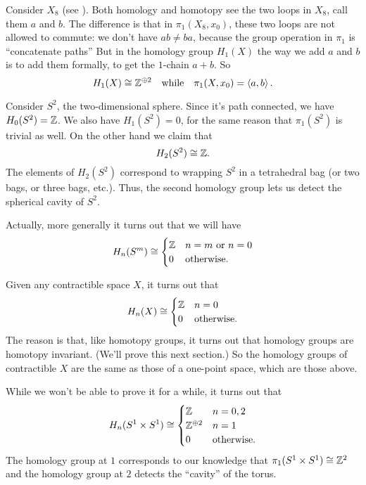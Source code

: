\begin{example}
	Consider $X_8$ (see ).
	Both homology and homotopy see the two loops in $X_8$, call them $a$ and $b$.
	The difference is that in $\pi_1(X_8, x_0)$,
	these two loops are not allowed to commute: we don't have $ab \neq ba$,
	because the group operation in $\pi_1$ is ``concatenate paths''
	But in the homology group $H_1(X)$ the way we add $a$ and $b$
	is to add them formally, to get the $1$-chain $a+b$.
	So \[ H_1(X) \cong \mathbb Z^{\oplus 2} \quad\text{while}\quad \pi_1(X, x_0) = \left< a,b\right>. \]
\end{example}

\begin{example}
	Consider $S^2$, the two-dimensional sphere.
	Since it's path connected, we have $H_0(S^2) = \mathbb Z$.
	We also have $H_1(S^2) = 0$, for the same reason that $\pi_1(S^2)$ is trivial as well.
	On the other hand we claim that \[ H_2(S^2) \cong \mathbb Z. \]
	The elements of $H_2(S^2)$ correspond to wrapping $S^2$ in a tetrahedral bag
	(or two bags, or three bags, etc.).
	Thus, the second homology group lets us detect the spherical cavity of $S^2$.
\end{example}
Actually, more generally it turns out that we will have
\[
	H_n(S^m) \cong 
	\begin{cases}
		\mathbb Z & n=m \text{ or } n=0 \\
		0 & \text{otherwise}.
	\end{cases}
\]

\begin{example}
	Given any contractible space $X$, it turns out that
	\[
		H_n(X)
		\cong
		\begin{cases}
			\mathbb Z & n = 0 \\
			0 & \text{otherwise}.
		\end{cases}
	\]
	The reason is that, like homotopy groups, it turns out
	that homology groups are homotopy invariant.
	(We'll prove this next section.)
	So the homology groups of contractible $X$ are the same
	as those of a one-point space, which are those above.
\end{example}

\begin{example}
	While we won't be able to prove it for a while, it turns out that
	\[
		H_n(S^1 \times S^1)
		\cong
		\begin{cases}
			\mathbb Z & n = 0,2 \\
			\mathbb Z^{\oplus 2} & n = 1 \\
			0 & \text{otherwise}.
		\end{cases}
	\]
	The homology group at $1$ corresponds to our knowledge that $\pi_1(S^1 \times S^1) \cong \mathbb Z^2$
	and the homology group at $2$ detects the ``cavity'' of the torus.
\end{example}


